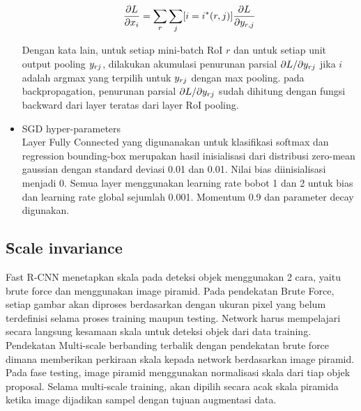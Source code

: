 \begin{itemize}
	\begin{equation}
	\label{equ:backward_roi_pooling}
	\frac{\partial L}{\partial x_i} = \sum_{r}^{}\sum_{j}^{}[i = i^* (r,j)] \frac{\partial L}{\partial y\sb{r,j}}
	\end{equation}
	
	Dengan kata lain, untuk setiap mini-batch RoI $r$ dan untuk setiap unit output pooling $y\sb{rj}$, dilakukan akumulasi penurunan parsial $\partial L/\partial y\sb{rj}$ jika $i$ adalah argmax yang terpilih untuk $y\sb{rj}$ dengan max pooling. pada backpropagation, penurunan parsial $\partial L/\partial y\sb{rj}$ sudah dihitung dengan fungsi backward dari layer teratas dari layer RoI pooling.
	
	\item SGD hyper-parameters\\
	Layer Fully Connected yang digunanakan untuk klasifikasi softmax dan regression bounding-box merupakan hasil inisialisasi dari distribusi zero-mean gaussian dengan standard deviasi 0.01 dan 0.01. Nilai bias diinisialisasi menjadi 0. Semua layer menggunakan learning rate bobot 1 dan 2 untuk bias dan learning rate global sejumlah 0.001. Momentum 0.9 dan parameter decay digunakan.
\end{itemize}

\subsection{\f{Scale invariance}}
Fast R-CNN menetapkan skala pada deteksi objek menggunakan 2 cara, yaitu brute force dan menggunakan image piramid. Pada pendekatan Brute Force, setiap gambar akan diproses berdasarkan dengan ukuran pixel yang belum terdefinisi selama proses training maupun testing. Network harus mempelajari secara langsung kesamaan skala untuk deteksi objek dari data training. Pendekatan Multi-scale berbanding terbalik dengan pendekatan brute force dimana memberikan perkiraan skala kepada network berdasarkan image piramid. Pada fase testing, image piramid menggunakan normalisasi skala dari tiap objek proposal. Selama multi-scale training, akan dipilih secara acak skala piramida ketika image dijadikan sampel dengan tujuan augmentasi data.

